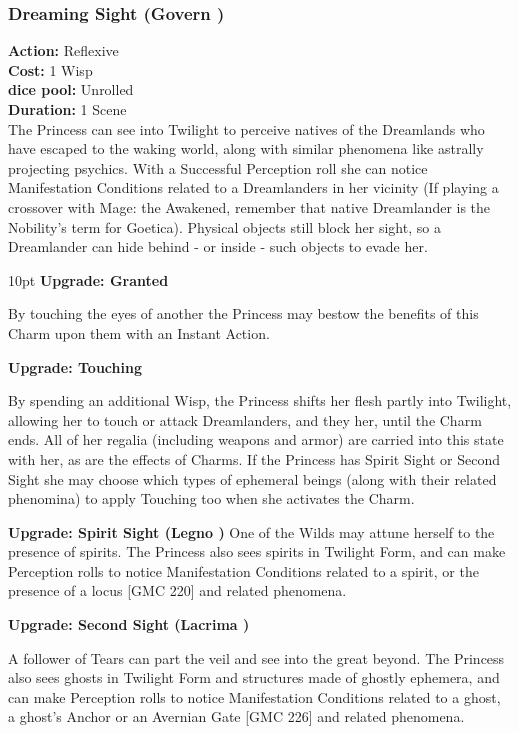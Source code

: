 \subsubsection*{Dreaming Sight (Govern \textbullet)}

\noindent \textbf{Action:} Reflexive\\ 

\noindent \textbf{Cost:} 1 Wisp\\ 

\noindent \textbf{dice pool:} Unrolled\\ 

\noindent \textbf{Duration:} 1 Scene\\ 

\noindent The Princess can see into Twilight to perceive natives of the Dreamlands who have escaped to the waking world, along with similar phenomena like astrally projecting psychics. With a Successful Perception roll she can notice Manifestation Conditions related to a Dreamlanders in her vicinity (If playing a crossover with Mage: the Awakened, remember that native Dreamlander is the Nobility's term for Goetica). Physical objects still block her sight, so a Dreamlander can hide behind - or inside - such objects to evade her.	

\begin{myindentpar}{10pt} \textbf{Upgrade: Granted}

By touching the eyes of another the Princess may bestow the benefits of this Charm upon them with an Instant Action. 

\textbf{Upgrade: Touching}
 
By spending an additional Wisp, the Princess shifts her flesh partly into Twilight, allowing her to touch or attack Dreamlanders, and they her, until the Charm ends. All of her regalia (including weapons and armor) are carried into this state with her, as are the effects of Charms. If the Princess has Spirit Sight or Second Sight she may choose which types of ephemeral beings (along with their related phenomina) to apply Touching too when she activates the Charm. 

\textbf{Upgrade: Spirit Sight (Legno \textbullet)}
One of the Wilds may attune herself to the presence of spirits. The Princess also sees spirits in Twilight Form, and can make Perception rolls to notice Manifestation Conditions related to a spirit, or the presence of a locus [GMC 220] and related phenomena.

\textbf{Upgrade: Second Sight (Lacrima \textbullet)}

A follower of Tears can part the veil and see into the great beyond. The Princess also sees ghosts in Twilight Form and structures made of ghostly ephemera, and can make Perception rolls to notice Manifestation Conditions related to a ghost, a ghost’s Anchor or an Avernian Gate [GMC 226] and related phenomena.\end{myindentpar}


